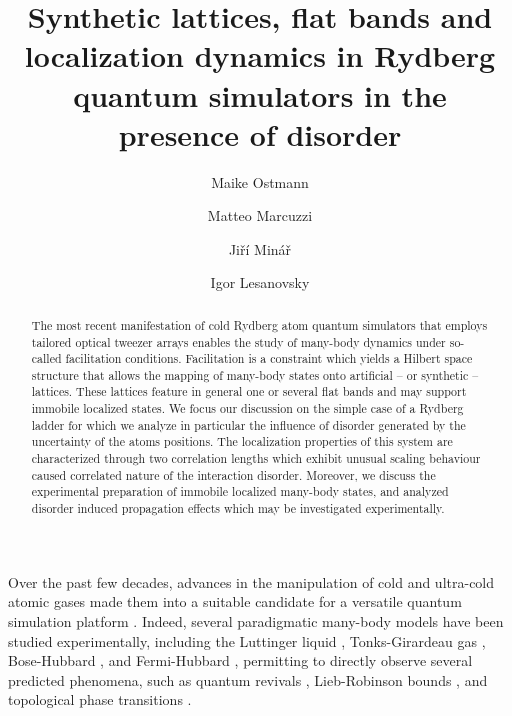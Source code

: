 \documentclass[prl,aps,twocolumn,showpacs,superscriptaddress,longbibliography]{revtex4-1}
\begin{document}
\title{Synthetic lattices, flat bands and localization dynamics in Rydberg quantum simulators in the presence of disorder}

\author{Maike Ostmann}
\author{Matteo Marcuzzi}
\author{Ji\v{r}\'{i} Min\'{a}\v{r}}
\author{Igor Lesanovsky}



\begin{abstract}
The most recent manifestation of cold Rydberg atom quantum simulators that employs tailored optical tweezer arrays enables the study of many-body dynamics under so-called facilitation conditions. Facilitation is a constraint which yields a Hilbert space structure that allows the mapping of many-body states onto artificial -- or synthetic -- lattices. These lattices feature in general one or several flat bands and may support immobile localized states. We focus our discussion on the simple case of a Rydberg ladder for which we analyze in particular the influence of disorder generated by the uncertainty of the atoms positions. The localization properties of this system are characterized through two correlation lengths which exhibit unusual scaling behaviour caused correlated nature of the interaction disorder. Moreover, we discuss the experimental preparation of immobile localized many-body states, and analyzed disorder induced propagation effects which may be investigated experimentally.
\end{abstract}
\pacs{}
\maketitle


Over the past few decades, advances in the manipulation of cold and ultra-cold atomic gases made them into a suitable candidate for a versatile quantum simulation platform \cite{Bloch_2008,Bloch_2012}. Indeed, several paradigmatic many-body models have been studied experimentally, including the Luttinger liquid \cite{hofferberth2007}, Tonks-Girardeau gas \cite{kinoshita2004}, Bose-Hubbard \cite{greiner2002, greiner2003}, and Fermi-Hubbard \cite{Kohl2005}, permitting to directly observe several predicted phenomena, such as quantum revivals \cite{greiner2002_revival}, Lieb-Robinson bounds \cite{cheneau2012}, and topological phase transitions \cite{hadzibabic2006}.
\end{document}
